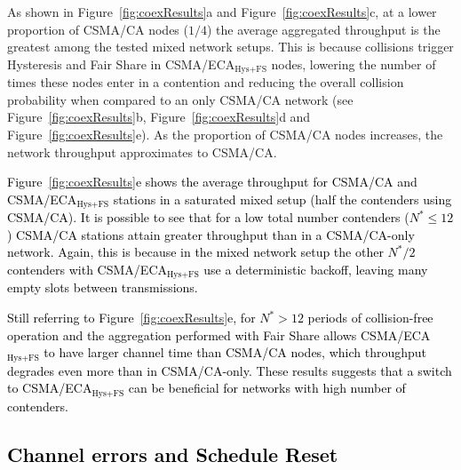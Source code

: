 	As shown in Figure~\ref{fig:coexResults}a and Figure~\ref{fig:coexResults}c, at a lower proportion of CSMA/CA nodes ($1/4$) the average aggregated throughput is the greatest among the tested mixed network setups. This is because collisions trigger Hysteresis and Fair Share in CSMA/ECA$_{\text{Hys+FS}}$ nodes, lowering the number of times these nodes enter in a contention and reducing the overall collision probability when compared to an only CSMA/CA network (see Figure~\ref{fig:coexResults}b, Figure~\ref{fig:coexResults}d and Figure~\ref{fig:coexResults}e). As the proportion of CSMA/CA nodes increases, the network throughput approximates to CSMA/CA.
	
	\textcolor{black}{Figure~\ref{fig:coexResults}e shows the average throughput for CSMA/CA and CSMA/ECA$_{\text{Hys+FS}}$ stations in a saturated mixed setup (half the contenders using CSMA/CA). It is possible to see that for a low total number contenders ($N^{*}\leq 12$) CSMA/CA stations attain greater throughput than in a CSMA/CA-only network. Again, this is because in the mixed network setup the other $N^{*}/2$ contenders with CSMA/ECA$_{\text{Hys+FS}}$ use a deterministic backoff, leaving many empty slots between transmissions.} 
	
	\textcolor{black}{Still referring to Figure~\ref{fig:coexResults}e, for $N^{*}>12$ periods of collision-free operation and the aggregation performed with Fair Share allows CSMA/ECA$_{\text{Hys+FS}}$ to have larger channel time than CSMA/CA nodes, which throughput degrades even more than in CSMA/CA-only. These results suggests that a switch to CSMA/ECA$_{\text{Hys+FS}}$ can be beneficial for networks with high number of contenders.}
	
	
	
	\textcolor{black}{\subsection{Channel errors and Schedule Reset}\label{resultsSchedRest}}
	

